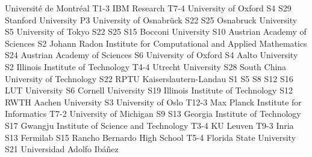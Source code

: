 \begin{multicols}{2}
{}
{}
{}
{}
{}
{}
{Universit\'e de Montr\'eal}
{T1-3}
{}
{}
{}
{}
{}
{}
{IBM Research}
{T7-4}
{}
{}
{}
{}
{}
{}
{University of Oxford}
{S4}
{S29}
{}
{}
{}
{}
{}
{Stanford University}
{P3}
{}
{}
{}
{}
{}
{}
{University of Osnabr\"uck}
{S22}
{S25}
{}
{}
{}
{}
{}
{Osnabruck University}
{S5}
{}
{}
{}
{}
{}
{}
{University of Tokyo}
{S22}
{S25}
{S15}
{}
{}
{}
{}
{Bocconi University}
{S10}
{}
{}
{}
{}
{}
{}
{Austrian Academy of Sciences}
{S2}
{}
{}
{}
{}
{}
{}
{Johann Radon Institute for Computational and Applied Mathematics}
{S24}
{}
{}
{}
{}
{}
{}
{Austrian Academy of Sciences}
{S6}
{}
{}
{}
{}
{}
{}
{University of Oxford}
{S4}
{}
{}
{}
{}
{}
{}
{Aalto University}
{S2}
{}
{}
{}
{}
{}
{}
{Illinois Institute of Technology}
{T4-4}
{}
{}
{}
{}
{}
{}
{Utrecht University}
{S28}
{}
{}
{}
{}
{}
{}
{South China University of Technology}
{S22}
{}
{}
{}
{}
{}
{}
{RPTU Kaiserslautern-Landau}
{S1}
{S5}
{S8}
{S12}
{S16}
{}
{}
{LUT University}
{S6}
{}
{}
{}
{}
{}
{}
{Cornell University}
{S19}
{}
{}
{}
{}
{}
{}
{Illinois Institute of Technology}
{S12}
{}
{}
{}
{}
{}
{}
{RWTH Aachen University}
{S3}
{}
{}
{}
{}
{}
{}
{University of Oslo}
{T12-3}
{}
{}
{}
{}
{}
{}
{Max Planck Institute for Informatics}
{T7-2}
{}
{}
{}
{}
{}
{}
{University of Michigan}
{S9}
{S13}
{}
{}
{}
{}
{}
{Georgia Institute of Technology}
{S17}
{}
{}
{}
{}
{}
{}
{Gwangju Institute of Science and Technology}
{T3-4}
{}
{}
{}
{}
{}
{}
{KU Leuven}
{T9-3}
{}
{}
{}
{}
{}
{}
{Inria}
{S13}
{}
{}
{}
{}
{}
{}
{Fermilab}
{S15}
{}
{}
{}
{}
{}
{}
{Rancho Bernardo High School}
{T5-4}
{}
{}
{}
{}
{}
{}
{Florida State University}
{S21}
{}
{}
{}
{}
{}
{}
{Universidad Adolfo Ib\'a\~nez}

\end{multicols}
